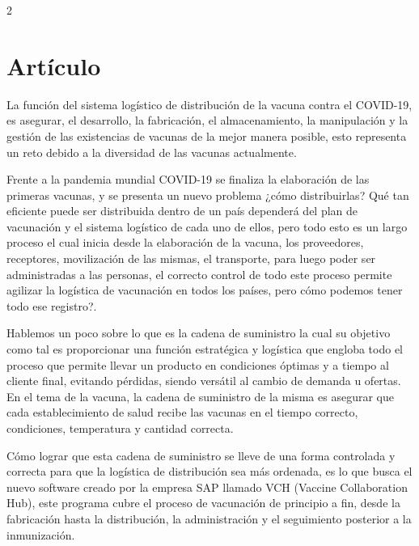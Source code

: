 \documentclass[12pt,spanish,Letterpaper,openany]{book}
\newcommand{\spacethreemilis}{\vspace{3mm}}
\newcommand{\spacetwomilis}{\vspace{2mm}}
\begin{document}
\begin {multicols}{2}

\hypertarget{artuxedculo-2}{%
\section{Artículo}\label{artuxedculo-2}}

La función del sistema logístico de distribución de la vacuna contra el COVID-19, es
asegurar, el desarrollo, la fabricación, el almacenamiento, la manipulación y la gestión de las
existencias de vacunas de la mejor manera posible, esto representa un reto debido a la
diversidad de las vacunas actualmente.

\spacethreemilis

Frente a la pandemia mundial COVID-19 se finaliza la elaboración de las primeras vacunas,
y se presenta un nuevo problema ¿cómo distribuirlas? Qué tan eficiente puede ser distribuida
dentro de un país dependerá del plan de vacunación y el sistema logístico de cada uno de
ellos, pero todo esto es un largo proceso el cual inicia desde la elaboración de la vacuna, los
proveedores, receptores, movilización de las mismas, el transporte, para luego poder ser
administradas a las personas, el correcto control de todo este proceso permite agilizar la
logística de vacunación en todos los países, pero cómo podemos tener todo ese registro?.

\spacethreemilis

Hablemos un poco sobre lo que es la cadena de suministro la cual su objetivo como tal es
proporcionar una función estratégica y logística que engloba todo el proceso que permite
llevar un producto en condiciones óptimas y a tiempo al cliente final, evitando pérdidas,
siendo versátil al cambio de demanda u ofertas. En el tema de la vacuna, la cadena de
suministro de la misma es asegurar que cada establecimiento de salud recibe las vacunas en el
tiempo correcto, condiciones, temperatura y cantidad correcta.

\spacetwomilis

Cómo lograr que esta cadena de suministro se lleve de una forma controlada y correcta para
que la logística de distribución sea más ordenada, es lo que busca el nuevo software creado
por la empresa SAP llamado VCH (Vaccine Collaboration Hub), este programa cubre el
proceso de vacunación de principio a fin, desde la fabricación hasta la distribución, la
administración y el seguimiento posterior a la inmunización.

\spacethreemilis


\end{multicols}
\end{document}
